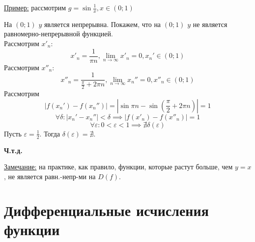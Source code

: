 \documentclass[12pt]{article}
\begin{document}
    \underline{Пример:} рассмотрим $g = \sin \frac{1}{x}, x \in (0; 1)$
    \begin{adjustwidth}{1.5em}{1.5em}
        На $(0; 1)$ $y$ является непрерывна. Покажем, что на $(0; 1)$ $y$ не является равномерно-непрерывной функцией.\\
        Рассмотрим $x'_n$:
        \[x'_n = \frac{1}{\pi n}, \lim_{n\to\infty} x'_n = 0, x_n' \in (0; 1)\]
        Рассмотрим $x''_n$: 
        \[x''_n = \frac{1}{\frac{\pi}{2}+2\pi n}, \lim_{n\to\infty}x_n'' = 0, x''_n \in (0; 1)\]
        Рассмотрим 
        \[|f(x_n') - f(x_n'')| = |\sin \pi n - \sin (\frac{\pi}{2} + 2\pi n)| = 1\]
        \[ \forall \delta : |x_n' - x_n''| < \delta \implies |f(x'_n) - f(x''_n)| = 1 \]
        \[ \forall \varepsilon : 0 < \varepsilon < 1 \implies \nexists \delta(\varepsilon) \]
        Пусть $\varepsilon = \frac{1}{2}$. Тогда $\delta(\varepsilon) = \nexists$.
        \begin{center}
            \textbf{Ч.т.д.}
        \end{center}
    \end{adjustwidth}
    \underline{Замечание:} на практике, как правило, функции, которые растут больше, чем $y=x$, не является равн.-непр-ми на $D(f)$.



    \section{Дифференциальные исчисления функции}
\end{document}
